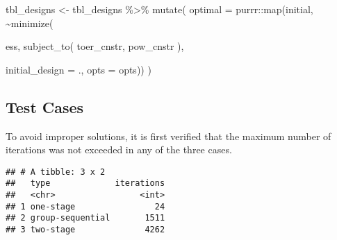 \documentclass[
]{book}
\newenvironment{Shaded}{\begin{snugshade}}{\end{snugshade}}
\newcommand{\AttributeTok}[1]{\textcolor[rgb]{0.77,0.63,0.00}{#1}}
\newcommand{\FunctionTok}[1]{\textcolor[rgb]{0.00,0.00,0.00}{#1}}
\newcommand{\NormalTok}[1]{#1}
\newcommand{\OtherTok}[1]{\textcolor[rgb]{0.56,0.35,0.01}{#1}}
\newcommand{\SpecialCharTok}[1]{\textcolor[rgb]{0.00,0.00,0.00}{#1}}
\begin{document}
\begin{Shaded}
\begin{Highlighting}[]
\NormalTok{tbl\_designs }\OtherTok{\textless{}{-}}\NormalTok{ tbl\_designs }\SpecialCharTok{\%\textgreater{}\%} 
    \FunctionTok{mutate}\NormalTok{(}
       \AttributeTok{optimal =}\NormalTok{ purrr}\SpecialCharTok{::}\FunctionTok{map}\NormalTok{(initial, }\SpecialCharTok{\textasciitilde{}}\FunctionTok{minimize}\NormalTok{(}
         
\NormalTok{          ess,}
          \FunctionTok{subject\_to}\NormalTok{(}
\NormalTok{              toer\_cnstr,}
\NormalTok{              pow\_cnstr}
\NormalTok{          ),}
          
          \AttributeTok{initial\_design =}\NormalTok{ ., }
          \AttributeTok{opts           =}\NormalTok{ opts)) )}
\end{Highlighting}
\end{Shaded}

\hypertarget{test-cases}{%
\subsection{Test Cases}\label{test-cases}}

To avoid improper solutions, it is first verified that the maximum
number of iterations was not exceeded in any of the three cases.

\begin{Shaded}
\end{Shaded}

\begin{verbatim}
## # A tibble: 3 x 2
##   type             iterations
##   <chr>                 <int>
## 1 one-stage                24
## 2 group-sequential       1511
## 3 two-stage              4262
\end{verbatim}
\end{document}
